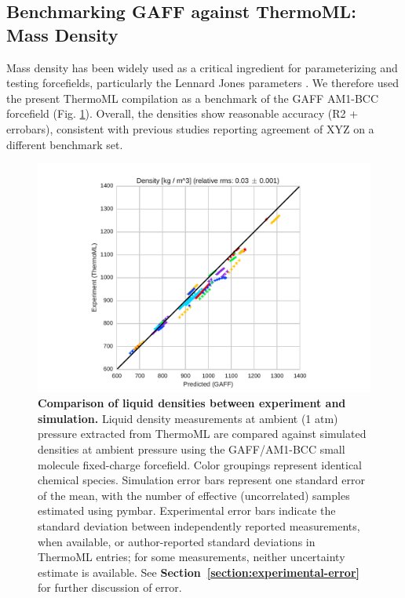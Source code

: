 \documentclass[aps,pre,twocolumn,nofootinbib,superscriptaddress,linenumbers]{revtex4-1}
\begin{document}

\subsection{Benchmarking GAFF against ThermoML: Mass Density}

Mass density has been widely used as a critical ingredient for parameterizing and testing forcefields, particularly the Lennard Jones parameters \cite{jorgensen1983comparison, jorgensen1984optimized}.  
We therefore used the present ThermoML compilation as a benchmark of the GAFF AM1-BCC forcefield (Fig. \ref{figure:Density}).  
Overall, the densities show reasonable accuracy (R2 + errobars), consistent with previous studies \cite{caleman2011force} reporting agreement of XYZ on a different benchmark set.  


\begin{figure}
\includegraphics[width=\columnwidth]{./figures/densities_thermoml.pdf}
\caption{{\bf Comparison of liquid densities between experiment and simulation.}
Liquid density measurements at ambient (1 atm) pressure extracted from ThermoML are compared against simulated densities at ambient pressure using the GAFF/AM1-BCC small molecule fixed-charge forcefield.
Color groupings represent identical chemical species.  
Simulation error bars represent one standard error of the mean, with the number of effective (uncorrelated) samples estimated using pymbar.  
Experimental error bars indicate the standard deviation between independently reported measurements, when available, or author-reported standard deviations in ThermoML entries; for some measurements, neither uncertainty estimate is available.  
See {\bf Section~\ref{section:experimental-error}} for further discussion of error.
}
\label{figure:Density}
\end{figure}
\end{document}
